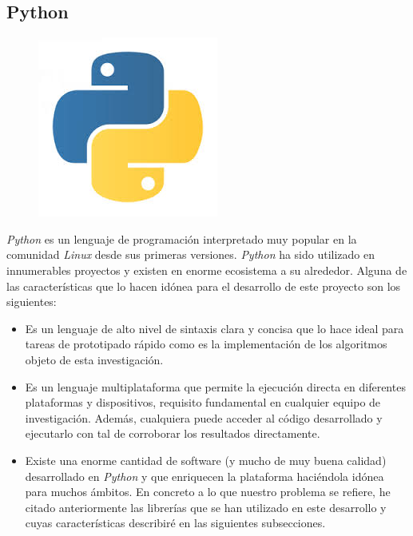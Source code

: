 \documentclass[10pt,a4paper]{report}
\begin{document}
\subsection{Python\cite{PythonDoc2014}}
\begin{figure}[!h]{}
    \centering
    \includegraphics[scale=0.3]{img/logoPython.jpg}
\end{figure}
\textit{Python} es un lenguaje de programación interpretado muy popular en la comunidad \textit{Linux} desde sus primeras versiones. \textit{Python} ha sido utilizado en innumerables proyectos y existen en enorme ecosistema a su alrededor. Alguna de las características que lo hacen idónea para el desarrollo de este proyecto son los siguientes:
\begin{itemize}
	\item Es un lenguaje de alto nivel de sintaxis clara y concisa que lo hace ideal para tareas de prototipado rápido como es la implementación de los algoritmos objeto de esta investigación.
	\item Es un lenguaje multiplataforma que permite la ejecución directa en diferentes plataformas y dispositivos, requisito fundamental en cualquier equipo de investigación. Además, cualquiera puede acceder al código desarrollado y ejecutarlo con tal de corroborar los resultados directamente.
	\item Existe una enorme cantidad de software (y mucho de muy buena calidad) desarrollado en \textit{Python} y que enriquecen la plataforma haciéndola idónea para muchos ámbitos. En concreto a lo que nuestro problema se refiere, he citado anteriormente las librerías que se han utilizado en este desarrollo y cuyas características describiré en las siguientes subsecciones.
\end{itemize}
\end{document}
